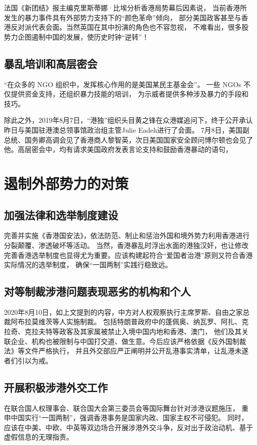 \documentclass[a4paper,12pt,UTF8,twoside]{article}
\begin{document}
法国《新团结》报主编克里斯蒂娜·比埃分析香港局势幕后因素说，
当前香港所发生的暴力事件具有外部势力支持下的“颜色革命”倾向，
部分美国政客甚至与香港反对派代表会面。当然英国在其中扮演的角色也不容忽视，
不难看出，很多股势力企图遏制中国的发展，使历史时钟“逆转”！

\subsection{暴乱培训和高层密会}
“在众多的 NGO 组织中，发挥核心作用的是美国某民主基金会”。
一些 NGOs 不仅提供资金支持，还组织暴力技能的培训，
为示威者提供多种涉及暴力的手段和技巧。

除此之外，2019年8月7日，“港独”组织头目黄之锋在众港媒追问下，终于公开承认昨日与美国驻港澳总领事馆政治组主管Julie Eadeh进行了会面。
7月8日，美国副总统、国务卿高调会见了香港商人黎智英，次日美国国家安全顾问博尔顿也会见了他。高层密会中，均有请求美国政府发表言论支持和鼓励香港暴动的语句，

\section{遏制外部势力的对策}

\subsection{加强法律和选举制度建设}
完善并实施《香港国安法》，依法防范、制止和惩治外国和境外势力利用香港进行分裂颠覆、渗透破坏等活动。
当然，香港暴乱时浮出水面的港独汉奸，也让修改完善香港选举制度也显得尤为重要。应该构建起符合“爱国者治港”原则又符合香港实际情况的选举制度，
确保“一国两制”实践行稳致远。

\subsection{对等制裁涉港问题表现恶劣的机构和个人}
2020年8月10日，如上文提到的内容，中方对人权观察执行主席罗斯、自由之家总裁阿布拉莫维茨等人实施制裁。
包括特朗普政府中的蓬佩奥、纳瓦罗、阿扎、克拉奇、克拉夫特等政客及其家属被禁止入境中国内地和香港、澳门，
他们及其关联企业、机构也被限制与中国打交道、做生意。今后应该严格依据《反外国制裁法》等文件严格执行，
并且外交部应严正阐明并公开乱港事实清单，让乱港未遂者们引以为戒。

\subsection{开展积极涉港外交工作}
在联合国人权理事会、联合国大会第三委员会等国际舞台针对涉港议题施压，
重申中国实行“一国两制”，强调香港事务是国家内政、国家主权不可侵犯。
同时，应该在中美、中欧、中英等双边场合开展涉港外交斗争，反对出于政治动机、基于虚假信息的无理指责。
\end{document}

